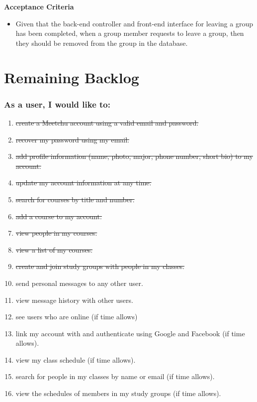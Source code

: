 \documentclass[12pt]{article}
\newcommand{\brbig}{\vspace{4mm}}
\begin{document}
\brbig

\textbf{Acceptance Criteria}
\begin{itemize}
\item Given that the back-end controller and front-end interface for leaving a group has been completed, when a group member requests to leave a group, then they should be removed from the group in the database.
\end{itemize}

\newpage

\section{Remaining Backlog}

\subsubsection*{As a user, I would like to:}

\begin{enumerate}[nolistsep]
    \item \st{create a Meetchu account using a valid email and password.}
    \item \st{recover my password using my email.}
    \item \st{add profile information (name, photo, major, phone number, short bio) to my account.}
    \item \st{update my account information at any time.}
    \item \st{search for courses by title and number.}
    \item \st{add a course to my account.}
    \item \st{view people in my courses.}
    \item \st{view a list of my courses.}
    \item \st{create and join study groups with people in my classes.}
    \item send personal messages to any other user.
    \item view message history with other users.
    \item see users who are online (if time allows)
    \item link my account with and authenticate using Google and Facebook (if time allows).
    \item view my class schedule (if time allows).
    \item search for people in my classes by name or email (if time allows).
    \item view the schedules of members in my study groups (if time allows).
\end{enumerate}
\end{document}
